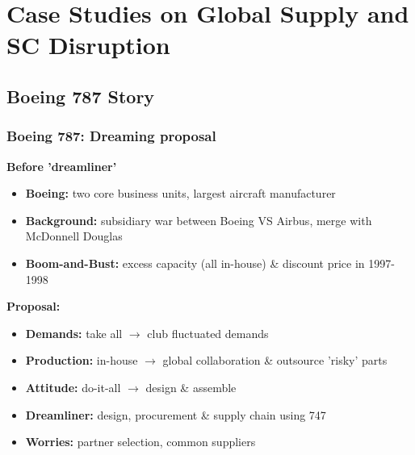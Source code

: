 \documentclass[10pt,presentation]{beamer}
\begin{document}
\begin{frame}
\end{frame}


\section[Case Study]{Case Studies on Global Supply and SC Disruption}
\subsection{Boeing 787 Story}
\begin{frame}
  \frametitle{Boeing 787: Dreaming proposal}

    \textbf{Before 'dreamliner'}
    \begin{itemize}
      \item \textbf{Boeing:} two core business units, largest aircraft manufacturer
      \item \textbf{Background:} subsidiary war between \alert{Boeing} VS \alert{Airbus}, merge with McDonnell Douglas
      \item \textbf{Boom-and-Bust:} excess \alert{capacity }(all in-house) \& \alert{discount price} in 1997-1998
    \end{itemize}

  \NextLine
  \textbf{Proposal:}
  \begin{itemize}
      \item \textbf{Demands:} take all $\rightarrow$ \alert{club fluctuated} demands
      \item \textbf{Production:} in-house $\rightarrow$ \alert{global collaboration} \& outsource 'risky' parts
      \item \textbf{Attitude:} do-it-all $\rightarrow$ \alert{design} \& \alert{assemble}
      \item \textbf{Dreamliner:} design, procurement \& supply chain using 747
      \item \textbf{Worries:} partner selection, common suppliers
  \end{itemize}


\end{frame}
\end{document}
